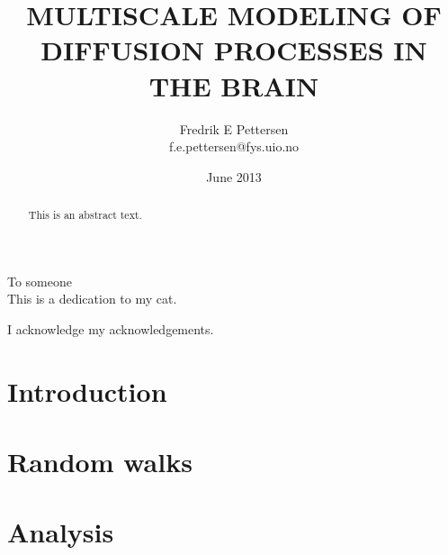\documentclass[twoside,english]{uiofysmaster}
\author{Fredrik E Pettersen\\ f.e.pettersen@fys.uio.no}
\title{\uppercase{Multiscale modeling of diffusion processes in the brain}}
\date{June 2013}
\begin{document}
%

\maketitle

\begin{abstract}
This is an abstract text.
\end{abstract}

\begin{dedication}
  To someone
  \\\vspace{12pt}
  This is a dedication to my cat.
\end{dedication}

\begin{acknowledgements}
  I acknowledge my acknowledgements.
\end{acknowledgements}


\tableofcontents
\clearpage
\listoffigures
\clearpage
\listoftables

\chapter{Introduction}


\chapter{Random walks}


\chapter{Analysis}

\end{document}
